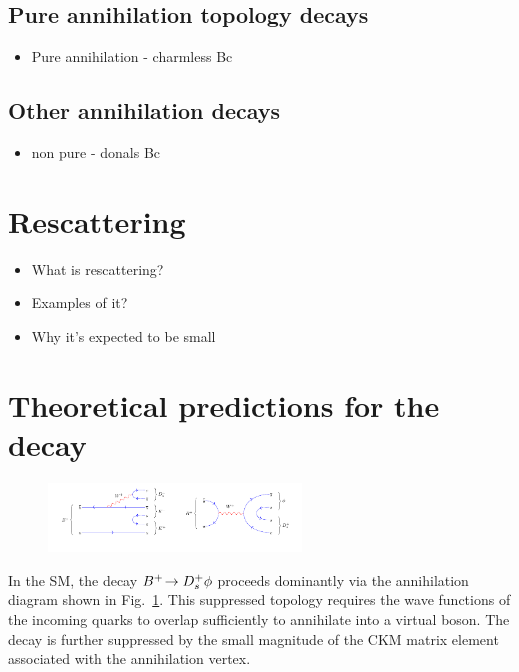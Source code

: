 \subsection{Pure annihilation topology decays}
{\color{Red}
\begin{itemize}
\item Pure annihilation - charmless Bc
\end{itemize}}
\subsection{Other annihilation decays}

{\color{Red}
\begin{itemize}
\item non pure - donals Bc 
\end{itemize}}

\section{Rescattering}

{\color{Red}
\begin{itemize}
\item What is rescattering?
\item Examples of it?
\item Why it's expected to be small
\end{itemize}}

\section{Theoretical predictions for the \decay{\Bp}{\Dsp\phiz} decay}

\begin{figure}[!h]
    \centering
    \includegraphics[width=0.6\textwidth]{figs/Theory/B2DsPhi.pdf}
    \caption{\decay{\Bp}{\Dsp\phiz} }
    \label{fig:Theory_DsPhiDiagram}   
\end{figure}



{\color{Blue}
In the SM, the decay ${{{B}^+}}\!\rightarrow {\ensuremath{{D}^+_{s}}}\phi$ proceeds dominantly via the annihilation diagram shown in Fig.~\ref{fig:Theory_DsPhiDiagram}. 
This suppressed topology requires the wave functions of the incoming quarks to overlap sufficiently to annihilate into a virtual \Wp boson. 
The decay is further suppressed by the small magnitude of the CKM matrix element \Vub associated with the annihilation vertex. 


}

